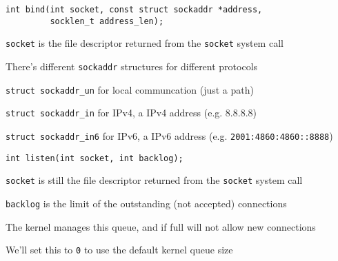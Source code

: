   \begin{slide}
    

    \begin{verbatim}
int bind(int socket, const struct sockaddr *address,
         socklen_t address_len);
    \end{verbatim}
    \medskip

    \texttt{socket} is the file descriptor returned from the \texttt{socket}
    system call
    \bigskip

    There's different \texttt{sockaddr} structures for different protocols

    \leftspace{}\texttt{struct sockaddr_un} for local communcation (just a path)

    \leftspace{}\texttt{struct sockaddr_in} for IPv4, a IPv4 address
                 (e.g. 8.8.8.8)

    \leftspace{}\texttt{struct sockaddr_in6} for IPv6, a IPv6 address
                 (e.g. \texttt{2001:4860:4860::8888})

  \end{slide}

  \begin{slide}
    

    \texttt{int listen(int socket, int backlog);}
    \medskip

    \texttt{socket} is still the file descriptor returned from the
    \texttt{socket} system call
    \medskip

    \texttt{backlog} is the limit of the outstanding (not accepted) connections

    \leftspace{}The kernel manages this queue, and if full will not allow new connections
    \medskip

    We'll set this to \texttt{0} to use the default kernel queue size
  \end{slide}

